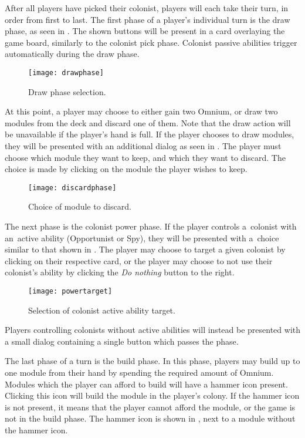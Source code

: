 After all players have picked their colonist, players will each take their turn,
in order from first to last. The first phase of a player's individual turn is
the draw phase, as seen in . The shown buttons will be present
in a card overlaying the game board, similarly to the colonist pick phase.
Colonist passive abilities trigger automatically during the draw phase.

\begin{figure}[ht]
\centerline{\mbox{\texttt{[image: drawphase]}}}
\caption{Draw phase selection.}\label{ud:drawphase}
\end{figure}

At this point, a player may choose to either gain two Omnium, or
draw two modules from the deck and discard one of them.
Note that the draw action will be unavailable if the player's hand is full.
If the player chooses to draw modules, they will be presented with an additional
dialog as seen in . The player must choose which module they
want to keep, and which they want to discard. The choice is made by clicking on the
module the player wishes to keep.

\begin{figure}[ht]
\centerline{\mbox{\texttt{[image: discardphase]}}}
\caption{Choice of module to discard.}\label{ud:discardphase}
\end{figure}

The next phase is the colonist power phase. If the player controls a~colonist
with an~active ability (Opportunist or Spy), they will be presented with a~choice
similar to that shown in . The player may choose to target
a given colonist by clicking on their respective card, or the player may choose
to not use their colonist's ability by clicking the \emph{Do nothing} button
to the right.

\begin{figure}[ht]
\centerline{\mbox{\texttt{[image: powertarget]}}}
\caption{Selection of colonist active ability target.}\label{ud:powertarget}
\end{figure}

Players controlling colonists without active abilities will instead be presented
with a small dialog containing a single button which passes the phase.

The last phase of a turn is the build phase. In this phase, players may build
up to one module from their hand by spending the required amount of Omnium.
Modules which the player can afford to build will have a hammer icon present.
Clicking this icon will build the module in the player's colony. If the hammer
icon is not present, it means that the player cannot afford the module,
or the game is not in the build phase. The hammer icon is shown in
, next to a module without the hammer icon.

